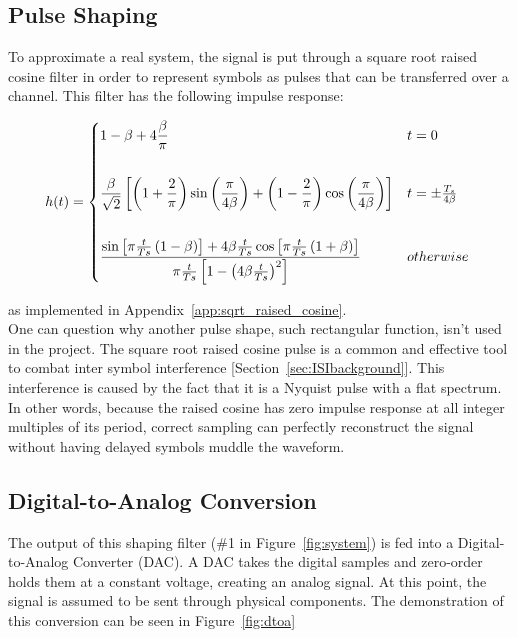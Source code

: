 \documentclass[]{article}
\begin{document}
\subsection{Pulse Shaping}
\label{sec:srrc}
To approximate a real system, the signal is put through a square root raised cosine filter in order to represent symbols as pulses that can be transferred over a channel. This filter has the following impulse response:

 \[
 h(t) = \begin{dcases*}
        1-\beta+4\frac{\beta}{\pi} &  $t = 0$\\ \\        
        \frac{\beta}{\sqrt{2}}\left[\left(1+\frac{2}{\pi}\right)\sin\left(\frac{\pi}{4\beta}\right)+\left(1-\frac{2}{\pi}\right)\cos\left(\frac{\pi}{4\beta}\right)\right] & $t=\pm \frac{T_s}{4\beta}$ \\ \\
        \frac{\sin\left[\pi\frac{t}{Ts}\left(1-\beta\right)\right]+4\beta\frac{t}{Ts}\cos\left[\pi\frac{t}{Ts}\left(1+\beta\right)\right]}{\pi\frac{t}{Ts}\left[1-\left(4\beta\frac{t}{Ts}\right)^2\right]} & $otherwise$ \\
        \end{dcases*}
\]

as implemented in Appendix~\ref{app:sqrt_raised_cosine}.  \\

One can question why another pulse shape, such rectangular function, isn't used in the project. The square root raised cosine pulse is a common and effective tool to combat inter symbol interference [Section~\ref{sec:ISIbackground}].  This interference is caused by the fact that it is a Nyquist pulse with a flat spectrum.  In other words, because the raised cosine has zero impulse response at all integer multiples of its period, correct sampling can perfectly reconstruct the signal without having delayed symbols muddle the waveform. 

\subsection{Digital-to-Analog Conversion}
\label{sec:da}
The output of this shaping filter (\#1 in Figure~\ref{fig:system}) is fed into a Digital-to-Analog Converter (DAC).  A DAC takes the digital samples and zero-order holds them at a constant voltage, creating an analog signal. At this point, the signal is assumed to be sent through physical components. The demonstration of this conversion can be seen in Figure~\ref{fig:dtoa} \\
\end{document}
